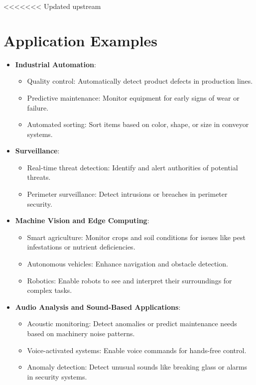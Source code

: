 <<<<<<< Updated upstream
\section{Application Examples}
\begin{itemize}
	\item \textbf{Industrial Automation}:
	\begin{itemize}
		\item Quality control: Automatically detect product defects in production lines.
		\item Predictive maintenance: Monitor equipment for early signs of wear or failure.
		\item Automated sorting: Sort items based on color, shape, or size in conveyor systems.\cite{arduino_datasheet:2025}
	\end{itemize}
	\item \textbf{Surveillance}:
	\begin{itemize}
		\item Real-time threat detection: Identify and alert authorities of potential threats.
		\item Perimeter surveillance: Detect intrusions or breaches in perimeter security.
	\end{itemize}
	\item \textbf{Machine Vision and Edge Computing}:
	\begin{itemize}
		\item Smart agriculture: Monitor crops and soil conditions for issues like pest infestations or nutrient deficiencies.
		\item Autonomous vehicles: Enhance navigation and obstacle detection.
		\item Robotics: Enable robots to see and interpret their surroundings for complex tasks.
	\end{itemize}
	\item \textbf{Audio Analysis and Sound-Based Applications}:
	\begin{itemize}
		\item Acoustic monitoring: Detect anomalies or predict maintenance needs based on machinery noise patterns.
		\item Voice-activated systems: Enable voice commands for hands-free control.
		\item Anomaly detection: Detect unusual sounds like breaking glass or alarms in security systems. \cite{arduino_datasheet:2025}
	\end{itemize}
\end{itemize}


